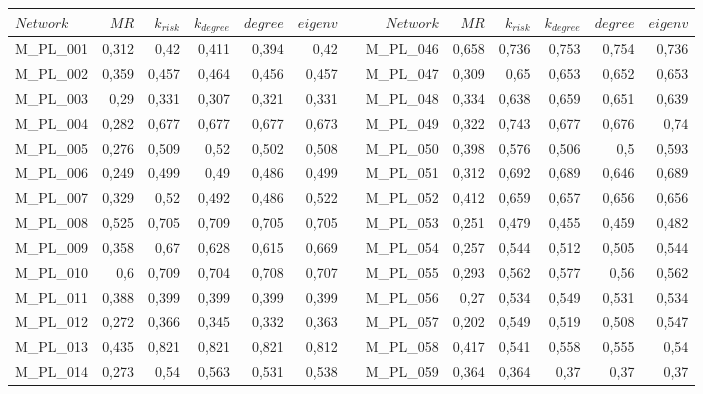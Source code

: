 \begin{table}[hp]
\fontsize{2.6mm}{2.6mm}\selectfont
  \centering
    \begin{adjustbox}{angle=90}
    \begin{tabular}{lrrrrrrrrrrrr}
    \toprule
    $Network$ & $MR$ & $k_{risk}$ & $k_{degree}$ & $degree$ & $eigenv$ &    & $Network$ & $MR$ & $k_{risk}$ & $k_{degree}$ & $degree$ & $eigenv$ \\
    \midrule
       M\_PL\_001 & 0,312 & 0,42 & 0,411 & 0,394 & 0,42 &      & M\_PL\_046 & 0,658 & 0,736 & 0,753 & 0,754 & 0,736 \\
    M\_PL\_002 & 0,359 & 0,457 & 0,464 & 0,456 & 0,457 &      & M\_PL\_047 & 0,309 & 0,65 & 0,653 & 0,652 & 0,653 \\
    M\_PL\_003 & 0,29 & 0,331 & 0,307 & 0,321 & 0,331 &      & M\_PL\_048 & 0,334 & 0,638 & 0,659 & 0,651 & 0,639 \\
    M\_PL\_004 & 0,282 & 0,677 & 0,677 & 0,677 & 0,673 &      & M\_PL\_049 & 0,322 & 0,743 & 0,677 & 0,676 & 0,74 \\
    M\_PL\_005 & 0,276 & 0,509 & 0,52 & 0,502 & 0,508 &      & M\_PL\_050 & 0,398 & 0,576 & 0,506 & 0,5  & 0,593 \\
    M\_PL\_006 & 0,249 & 0,499 & 0,49 & 0,486 & 0,499 &      & M\_PL\_051 & 0,312 & 0,692 & 0,689 & 0,646 & 0,689 \\
    M\_PL\_007 & 0,329 & 0,52 & 0,492 & 0,486 & 0,522 &      & M\_PL\_052 & 0,412 & 0,659 & 0,657 & 0,656 & 0,656 \\
    M\_PL\_008 & 0,525 & 0,705 & 0,709 & 0,705 & 0,705 &      & M\_PL\_053 & 0,251 & 0,479 & 0,455 & 0,459 & 0,482 \\
    M\_PL\_009 & 0,358 & 0,67 & 0,628 & 0,615 & 0,669 &      & M\_PL\_054 & 0,257 & 0,544 & 0,512 & 0,505 & 0,544 \\
    M\_PL\_010 & 0,6  & 0,709 & 0,704 & 0,708 & 0,707 &      & M\_PL\_055 & 0,293 & 0,562 & 0,577 & 0,56 & 0,562 \\
    M\_PL\_011 & 0,388 & 0,399 & 0,399 & 0,399 & 0,399 &      & M\_PL\_056 & 0,27 & 0,534 & 0,549 & 0,531 & 0,534 \\
    M\_PL\_012 & 0,272 & 0,366 & 0,345 & 0,332 & 0,363 &      & M\_PL\_057 & 0,202 & 0,549 & 0,519 & 0,508 & 0,547 \\
    M\_PL\_013 & 0,435 & 0,821 & 0,821 & 0,821 & 0,812 &      & M\_PL\_058 & 0,417 & 0,541 & 0,558 & 0,555 & 0,54 \\
    M\_PL\_014 & 0,273 & 0,54 & 0,563 & 0,531 & 0,538 &      & M\_PL\_059 & 0,364 & 0,364 & 0,37 & 0,37 & 0,37 \\

\end{tabular}
\end{adjustbox}
\end{table}
